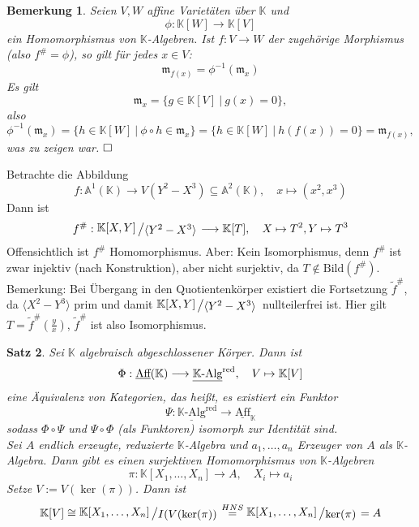 \documentclass[11pt]{book}
\newtheorem{theorem}{Satz}[section]
\newtheorem{remark}[theorem]{Bemerkung}
\theoremstyle{nonumberbreak}
\newenvironment{pr}[1][]{\ifthenelse{\equal{#1}{}}{\proof}{\proof[#1]}\rm}{\endproof}
\newenvironment{ex}[1][]{\ifthenelse{\equal{#1}{}}{\example}{\example[#1]}\rm}{\endexample}
\newcommand{\slant}[2]{{\raisebox{.1em}{$#1$}\left/\raisebox{-.1em}{$#2$}\right.}}
\begin{document}
\begin{spacing}{1.3}
\begin{remark}
Seien $V,W$ affine Varietäten über $\mathbb{K}$ und
$$\phi: \mathbb{K}[W] \longrightarrow \mathbb{K}[V]$$
ein Homomorphismus von $\mathbb{K}$-Algebren. Ist $f:V \longrightarrow W$ der zugehörige Morphismus (also $f^\#=\phi$), so gilt für jedes $x \in V$:
$$\mathfrak{m}_{f(x)}=\phi^{-1}(\mathfrak{m}_x)$$
\begin{pr}
Es gilt 
$$\mathfrak{m}_x= \{ g \in \mathbb{K}[V] \ \vert \ g(x)=0 \},$$
also
$$\phi^{-1}(\mathfrak{m}_x) = \{ h \in \mathbb{K}[W] \ \vert \ \phi \circ h \in \mathfrak{m}_x \} = \{ h \in \mathbb{K}[W] \ \vert \ h(f(x))=0 \} = \mathfrak{m}_{f(x)},$$
was zu zeigen war. $\hfill \Box$
\end{pr}
\end{remark}

\begin{ex} %

Betrachte die Abbildung
$$f: \mathbb{A}^1(\mathbb{K}) \longrightarrow V(Y^2-X^3) \subseteq \mathbb{A}^2(\mathbb{K}), \quad x \mapsto (x^2, x^3)$$
Dann ist 
$$f^\#: \slant{\mathbb{K}[X,Y]}{\langle Y^2-X^3\rangle} \longrightarrow \mathbb{K}[T], \quad X\mapsto T^2, Y \mapsto T^3$$
Offensichtlich ist $f^\#$ Homomorphismus. Aber: Kein Isomorphismus, denn $f^\#$ ist zwar injektiv (nach Konstruktion), aber nicht surjektiv, da $T \notin \textrm{Bild}(f^\#)$.\\
Bemerkung: Bei Übergang in den Quotientenkörper existiert die Fortsetzung $\tilde{f}^\#$, da $\langle X^2-Y^3\rangle$ prim und damit $\slant{\mathbb{K}[X,Y]}{\langle Y^2-X^3\rangle}$ nullteilerfrei ist. Hier gilt $T=\tilde{f}^\#\left(\frac{y}{x}\right)$, $\tilde{f}^\#$ ist also Isomorphismus.
\end{ex}

\begin{theorem} %
Sei $\mathbb{K}$ algebraisch abgeschlossener Körper. Dann ist 
$$\Phi: \textrm{\underline{Aff}}(\mathbb{K}) \longrightarrow \underline{ \mathbb{K}\textrm{-Alg}}^{\textrm{red}}, \quad V \mapsto \mathbb{K}[V]$$
eine Äquivalenz von Kategorien, das heißt, es existiert ein Funktor
$$\Psi: \underline{\mathbb{K}\textrm{-Alg}}^{\textrm{red}} \longrightarrow \underline{\textrm{Aff}}_{\mathbb{K}}$$
sodass $\Phi \circ \Psi$ und $\Psi \circ \Phi$ (als Funktoren) isomorph zur Identität sind.\\
\begin{pr}
Sei $A$ endlich erzeugte, reduzierte $\mathbb{K}$-Algebra und $a_1, \ldots, a_n$ Erzeuger von $A$ als $\mathbb{K}$-Algebra. Dann gibt es einen surjektiven Homomorphismus von $\mathbb{K}$-Algebren
$$\pi: \mathbb{K}[X_1, \ldots, X_n] \longrightarrow A, \quad X_i \mapsto a_i$$
Setze $V:=V(\ker(\pi))$. Dann ist 
$$\mathbb{K}[V] \cong \slant{\mathbb{K}[X_1, \ldots, X_n]}{I(V(\ker(\pi))} \overset{HNS}{=} \slant{\mathbb{K}[X_1, \ldots, X_n]}{\ker(\pi)} = A$$
\end{pr}
\end{theorem}




\end{spacing}
\end{document}
